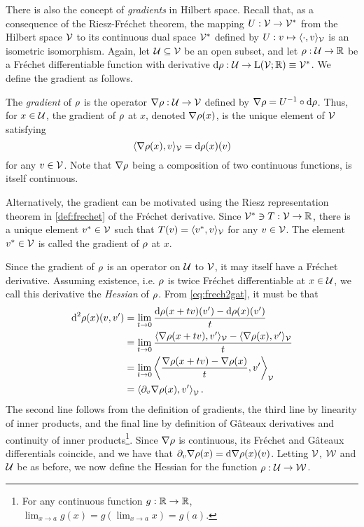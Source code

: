 There is also the concept of \emph{gradients} in Hilbert space.
Recall that, as a consequence of the Riesz-Fréchet theorem, the mapping $U:{\mathcal V}\to{\mathcal V}^*$ from the Hilbert space ${\mathcal V}$ to its continuous dual space ${\mathcal V}^*$ defined by $U:v\mapsto\langle\cdot,v\rangle_{\mathcal V}$ is an isometric isomorphism.
Again, let ${\mathcal U} \subseteq {\mathcal V}$ be an open subset, and let $\rho :{\mathcal U}\to\mathbb{R}$ be a Fréchet differentiable function with derivative $\text{d} \rho : {\mathcal U} \to \text{L}({\mathcal V};\mathbb{R}) \equiv {\mathcal V}^*$.
We define the gradient as follows.

\begin{definition}[Gradient]
  The \emph{gradient} of $\rho$ is the operator $\nabla \rho : {\mathcal U} \to {\mathcal V}$ defined by $\nabla \rho = U^{-1} \circ \text{d} \rho$.
  Thus, for $x \in {\mathcal U}$, the gradient of $\rho$ at $x$, denoted $\nabla \rho(x)$, is the unique element of ${\mathcal V}$ satisfying
  \[
    \langle\nabla \rho(x), v\rangle_{\mathcal V} = \text{d} \rho(x)(v)
  \]
  for any $v \in {\mathcal V}$.
  Note that $\nabla \rho$ being a composition of two continuous functions, is itself continuous.
\end{definition}

\begin{remark}
  Alternatively, the gradient can be motivated using the Riesz representation theorem in \cref{def:frechet} of the Fréchet derivative.
  Since ${\mathcal V}^*\ni T:{\mathcal V}\to\mathbb{R}$, there is a unique element $v^*\in{\mathcal V}$ such that $T(v)=\langle v^*,v\rangle_{\mathcal V}$ for any $v\in{\mathcal V}$.
  The element $v^*\in{\mathcal V}$ is called the gradient of $\rho$ at $x$.
\end{remark}

Since the gradient of $\rho$ is an operator on ${\mathcal U}$ to ${\mathcal V}$, it may itself have a Fréchet derivative.
Assuming existence, i.e. $\rho$ is twice Fréchet differentiable at $x \in {\mathcal U}$, we call this derivative the \emph{Hessian} of $\rho$.
From \cref{eq:frech2gat}, it must be that
\begin{align*}
  \d^2 \funder(x)(v,v') &= \lim_{t\to 0} \frac{\d \funder(x + t v)(v') - \d \funder(x)(v')}{t} \\
  &= \lim_{t\to 0} \frac{\ip{\nabla \funder(x+tv), v'}_\cV - \ip{\nabla \funder(x), v'}_\cV}{t} \\
  &= \lim_{t\to 0} \left\langle \frac{\nabla \funder(x+tv) - \nabla \funder(x)}{t} , v' \right\rangle_\cV \\%
  &= \left\langle \partial_v \nabla \funder(x) , v' \right\rangle_\cV.
\end{align*}
The second line follows from the definition of gradients, the third line by linearity of inner products, and the final line by definition of Gâteaux derivatives and continuity of inner products\footnote{For any continuous function $g:\mathbb{R}\to\mathbb{R}$, $\lim_{x\to a} g(x) = g(\lim_{x\to a} x) = g(a)$.}.
Since $\nabla \rho$ is continuous, its Fréchet and Gâteaux differentials coincide, and we have that $\partial_v \nabla \rho(x) = \text{d} \nabla \rho(x) (v)$.
Letting ${\mathcal V}$, ${\mathcal W}$ and ${\mathcal U}$ be as before, we now define the Hessian for the function $\rho :{\mathcal U} \to {\mathcal W}$.


